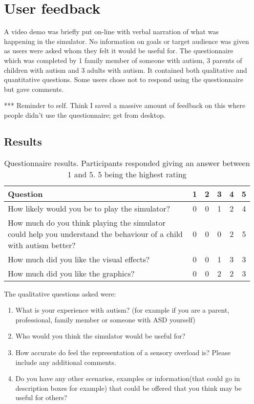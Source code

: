 \section{User feedback}
A video demo was briefly put on-line with verbal narration of what was happening in the simulator. No information on goals or target audience was given as users were asked whom they felt it would be useful for. The questionnaire which was completed by 1 family member of someone with autism, 3 parents of children with autism and 3 adults with autism. It contained both qualitative and quantitative questions. Some users chose not to respond using the questionnaire but gave comments. 

*** Reminder to self. Think I saved a massive amount of feedback on this where people didn't use the questionnaire; get from desktop.

\subsection{Results}

\begin{table}[H]
\caption{Questionnaire results. Participants responded giving an answer between 1 and 5. 5 being the highest rating}
\begin{tabular}{| p{9cm} | c c c c c |}
\hline
\textbf{Question} & 1 & 2 & 3 & 4 & 5 \\
\hline
How likely would you be to play the simulator? & 0 & 0 & 1 & 2 & 4 \\
\hline
How much do you think playing the simulator could help you understand the behaviour of a child with autism better? & 0 & 0 & 0 & 2 & 5 \\
\hline
How much did you like the visual effects? & 0 & 0 & 1 & 3 & 3 \\
\hline
How much did you like the graphics? & 0 & 0 & 2 & 2 & 3 \\ 
\hline
\end{tabular}
\end{table}

The qualitative questions asked were:
\begin{enumerate}
\item What is your experience with autism? (for example if you are a parent, professional, family member or someone with ASD yourself)
\item Who would you think the simulator would be useful for?
\item How accurate do feel the representation of a sensory overload is? Please include any additional comments.
\item Do you have any other scenarios, examples or information(that could go in description boxes for example) that could be offered that you think may be useful for others?
\end{enumerate}

